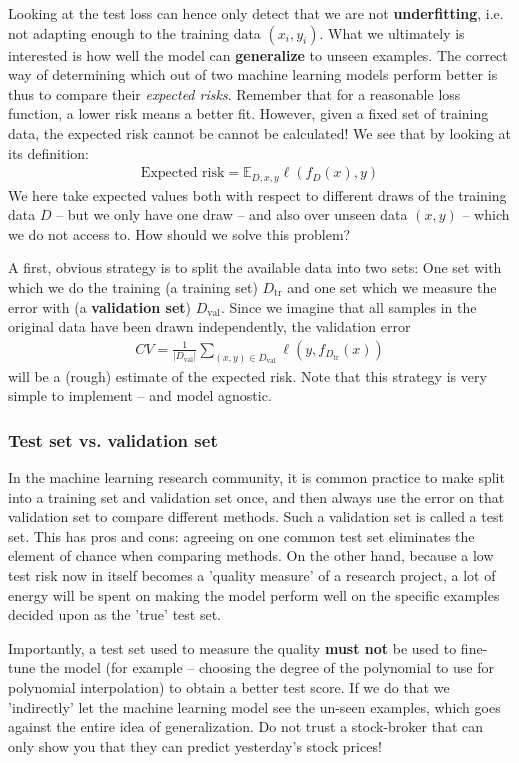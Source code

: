 \documentclass{article}
\newcommand{\tr}{\mathrm{tr}}
\newcommand{\abs}[1]{\vert #1 \vert}
\begin{document}
Looking at the test loss can hence only detect that we are not \textbf{underfitting}, i.e. not adapting enough to the training data $(x_i,y_i)$.  What we ultimately is interested is how well the model can \textbf{generalize} to unseen examples. The correct way of determining which out of two machine learning models perform better is thus to compare their \emph{expected risks}. Remember that for a reasonable loss function, a lower risk means a better fit. However, given a fixed set of training data, the expected risk cannot be cannot be calculated! We see that by looking at its definition:
\begin{align*}
    \text{Expected risk} = \mathbb{E}_{D,x,y} \ell(f_D(x),y)
\end{align*}
We here take expected values both with respect to different draws of the training data $D$ -- but we only have one draw -- and also over unseen data $(x,y)$ -- which we do not access to. How should we solve this problem?

A first, obvious strategy is to split the available data into two sets: One set with which we do the training (a training set) $D_{\mathrm{tr}}$ and one set which we measure the error with (a \textbf{validation set}) $D_{\mathrm{val}}$. Since we imagine that all samples in the original data have been drawn independently, the validation error 
\begin{align*}
    CV = \frac{1}{\abs{D_\mathrm{val}}} \sum_{(x,y) \in D_\mathrm{val}} \ell(y,f_{D_\tr}(x))
\end{align*}
will be a (rough) estimate of the expected risk. Note that this strategy is very simple to implement -- and model agnostic.

\subsubsection{Test set vs. validation set} In the machine learning research community, it is common practice to make split into a training set and validation set once, and then always use the error on that validation set to compare different methods. Such a validation set is called a test set. This has pros and cons: agreeing on one common test set eliminates the element of chance when comparing methods. On the other hand, because a low test risk now in itself becomes a 'quality measure' of a research project, a lot of energy will be spent on making the model perform well on the specific examples decided upon as the 'true' test set. 

Importantly, a test set used to measure the quality \textbf{must not} be used to fine-tune the model (for example -- choosing the degree of the polynomial to use for polynomial interpolation) to obtain a better test score. If we do that we 'indirectly' let the machine learning model see the un-seen examples, which goes against the entire idea of generalization. Do not trust a stock-broker that can only show you that they can predict yesterday's stock prices!
\end{document}
